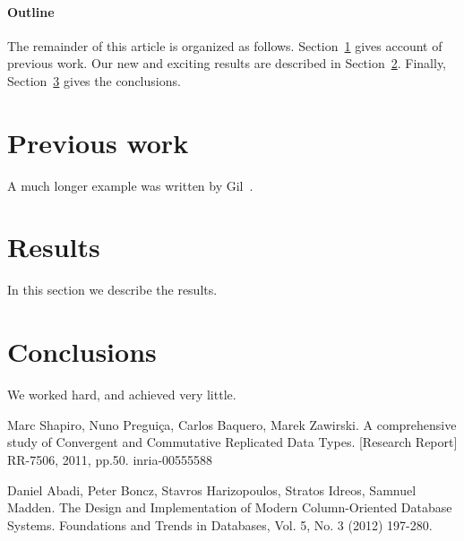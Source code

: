 \documentclass[12pt]{article}
\begin{document}
\paragraph{Outline}
The remainder of this article is organized as follows.
Section~\ref{previous work} gives account of previous work.
Our new and exciting results are described in Section~\ref{results}.
Finally, Section~\ref{conclusions} gives the conclusions.

\section{Previous work}\label{previous work}
A much longer \LaTeXe{} example was written by Gil~\cite{crdt2011}.

\section{Results}\label{results}
In this section we describe the results.

\section{Conclusions}\label{conclusions}
We worked hard, and achieved very little.



\begin{thebibliography}{9}

  Marc Shapiro, Nuno Pregui\c{c}a, Carlos Baquero, Marek Zawirski.
  A comprehensive study of Convergent and Commutative Replicated Data Types.
  [Research Report] RR-7506, 2011, pp.50.
  \textlangle{}inria-00555588\textrangle{}


  Daniel Abadi, Peter Boncz, Stavros Harizopoulos, Stratos Idreos, Samnuel Madden.
  The Design and Implementation of Modern Column-Oriented Database Systems.
  Foundations and Trends in Databases, Vol. 5, No. 3 (2012) 197-280.

\end{thebibliography}
\end{document}

